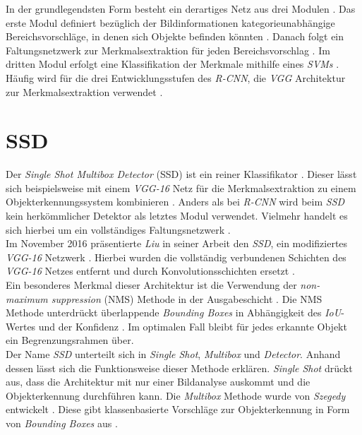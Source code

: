 		In der grundlegendsten Form besteht ein derartiges Netz aus drei Modulen \cite{rcnn}. Das erste Modul definiert bezüglich der Bildinformationen kategorieunabhängige Bereichsvorschläge, in denen sich Objekte befinden könnten \cite{rcnn}. Danach folgt ein Faltungsnetzwerk zur Merkmalsextraktion für jeden Bereichsvorschlag \cite{rcnn}. Im dritten Modul erfolgt eine Klassifikation der Merkmale mithilfe eines \textit{SVMs} \cite{rcnn}. Häufig wird für die drei Entwicklungsstufen des \textit{R-CNN}, die \textit{VGG} Architektur zur Merkmalsextraktion verwendet \cite{fastrcnn}.
		
		\section*{SSD}
		
		Der \textit{Single Shot Multibox Detector} (SSD) ist ein reiner Klassifikator \cite{ssd}. Dieser lässt sich beispielsweise mit einem \textit{VGG-16} Netz für die Merkmalsextraktion zu einem Objekterkennungssystem kombinieren \cite{ssd}. Anders als bei \textit{R-CNN} wird beim \textit{SSD} kein herkömmlicher Detektor als letztes Modul verwendet. Vielmehr handelt es sich hierbei um ein vollständiges Faltungsnetzwerk \cite{ssd}.\\
		
		Im November 2016 präsentierte \textit{Liu} in seiner Arbeit den \textit{SSD}, ein modifiziertes \textit{VGG-16} Netzwerk \cite{ssd}. Hierbei wurden die vollständig verbundenen Schichten des \textit{VGG-16} Netzes entfernt und durch Konvolutionsschichten ersetzt \cite{ssd}.\\
		
		Ein besonderes Merkmal dieser Architektur ist die Verwendung der \textit{non-maximum suppression} (NMS) Methode in der Ausgabeschicht \cite{ssd}. Die NMS Methode unterdrückt überlappende \textit{Bounding Boxes} in Abhängigkeit des \textit{IoU}-Wertes und der Konfidenz \cite{nms}. Im optimalen Fall bleibt für jedes erkannte Objekt ein Begrenzungsrahmen über.\\
		\newpage
		Der Name \textit{SSD} unterteilt sich in \textit{Single Shot}, \textit{Multibox} und \textit{Detector}. Anhand dessen lässt sich die Funktionsweise dieser Methode erklären. \textit{Single Shot} drückt aus, dass die Architektur mit nur einer Bildanalyse auskommt und die Objekterkennung durchführen kann. Die \textit{Multibox} Methode wurde von \textit{Szegedy} entwickelt \cite{multibox}. Diese gibt klassenbasierte Vorschläge zur Objekterkennung in Form von \textit{Bounding Boxes} aus \cite{multibox}.\\
		
